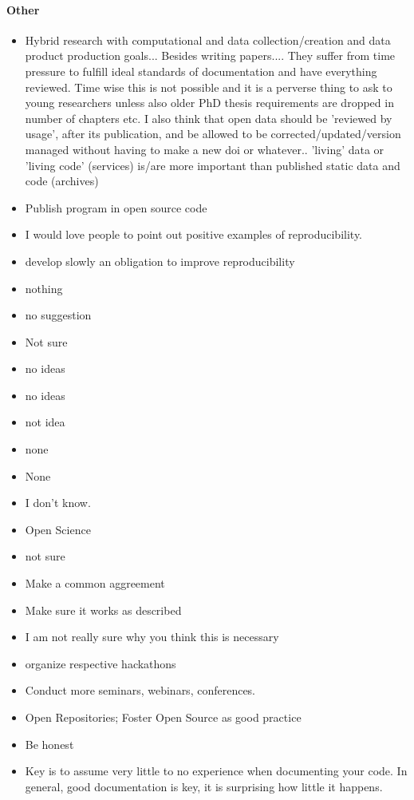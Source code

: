 \documentclass{article}
\begin{document}
\paragraph{Other}
\begin{itemize}
	\item Hybrid research with computational and data collection/creation and data product production goals... Besides writing papers.... They suffer from time pressure to fulfill ideal standards of documentation and have everything reviewed. Time wise this is not possible and it is a perverse thing to ask to young researchers unless also older PhD thesis requirements are dropped in number of chapters etc. I also think that open data should be 'reviewed by usage', after its publication, and be allowed to be corrected/updated/version managed without having to make a new doi or whatever.. 'living' data or 'living code' (services) is/are more important than published static data and code (archives)
	\item Publish program in open source code 
	\item I would love people to point out positive examples of reproducibility. 
	\item develop slowly an obligation to improve reproducibility
	\item nothing
	\item no suggestion
	\item Not sure
	\item no ideas
	\item no ideas
	\item not idea
	\item none
	\item None
	\item I don't know.
	\item Open Science 
	\item not sure
	\item Make a common aggreement
	\item Make sure it works as described
	\item I am not really sure why you think this is necessary
	\item organize respective hackathons
	\item Conduct more seminars, webinars, conferences.
	\item Open Repositories; Foster Open Source as good practice
	\item Be honest
	\item Key is to assume very little to no experience when documenting your code. In general, good documentation is key, it is surprising how little it happens.

\end{itemize}
\end{document}
